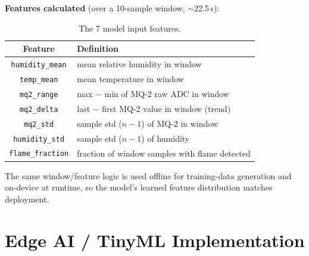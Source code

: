 \documentclass[11pt]{article}
\begin{document}
\textbf{Features calculated} (over a 10-sample window,
$\sim$22.5\,s):

\begin{table}[ht]
\centering
\begin{tabular}{cl}
\toprule
\textbf{Feature} & \textbf{Definition} \\
\midrule
\texttt{humidity\_mean}  & mean relative humidity in window \\
\texttt{temp\_mean}      & mean temperature in window \\
\texttt{mq2\_range}      & max $-$ min of MQ-2 raw ADC in window \\
\texttt{mq2\_delta}      & last $-$ first MQ-2 value in window (trend) \\
\texttt{mq2\_std}        & sample std ($n-1$) of MQ-2 in window \\
\texttt{humidity\_std}   & sample std ($n-1$) of humidity \\
\texttt{flame\_fraction} & fraction of window samples with flame detected \\
\bottomrule
\end{tabular}
\caption{The 7 model input features.}
\end{table}

The same window/feature logic is used offline for training-data
generation and on-device at runtime, so the model's learned feature
distribution matches deployment.

\section{Edge AI / TinyML Implementation}
\end{document}
